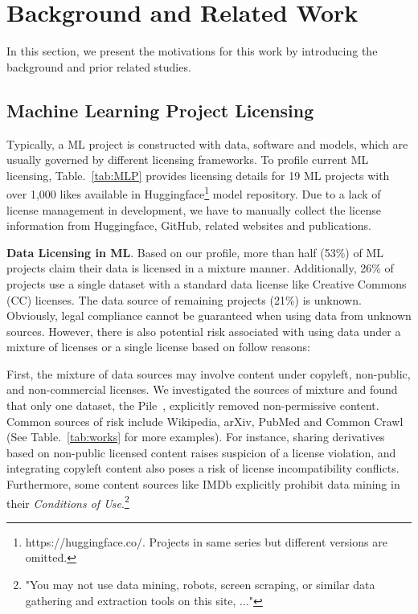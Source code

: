 \section{Background and Related Work}
\label{sec:related}
In this section, we present the motivations for this work by introducing the background and prior related studies.

\subsection{Machine Learning Project Licensing}
Typically, a ML project is constructed with data, software and models, which are usually governed by different licensing frameworks.
To profile current ML licensing, Table.~\ref{tab:MLP} provides licensing details for 19 ML projects with over 1,000 likes available in Huggingface\footnote{https://huggingface.co/. Projects in same series but different versions are omitted.} model repository.
Due to a lack of license management in development, we have to manually collect the license information from Huggingface, GitHub, related websites and publications.

\textbf{Data Licensing in ML}.
Based on our profile, more than half (53\%) of ML projects claim their data is licensed in a mixture manner.
Additionally, 26\% of projects use a single dataset with a standard data license like Creative Commons (CC) licenses.
The data source of remaining projects (21\%) is unknown.
Obviously, legal compliance cannot be guaranteed when using data from unknown sources. 
However, there is also potential risk associated with using data under a mixture of licenses or a single license based on follow reasons:

First, the mixture of data sources may involve content under copyleft, non-public, and non-commercial licenses. 
We investigated the sources of mixture and found that only one dataset, the Pile~\cite{gao2020the}, explicitly removed non-permissive content.
Common sources of risk include Wikipedia, arXiv, PubMed and Common Crawl~\cite{henderson2023foundation} (See Table.~\ref{tab:works} for more examples).
For instance, sharing derivatives based on non-public licensed content raises suspicion of a license violation, and integrating copyleft content also poses a risk of license incompatibility conflicts.
Furthermore, some content sources like IMDb explicitly prohibit data mining in their \textit{Conditions of Use}.\footnote{"You may not use data mining, robots, screen scraping, or similar data gathering and extraction tools on this site, ..."}

